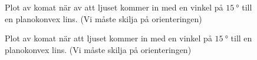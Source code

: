 \documentclass[a4paper]{article}
\begin{document}
\begin{figure}[h]
	\centering
	
	\caption{Plot av komat när av att ljuset kommer in med en vinkel på $\SI{15}{\degree}$ till en planokonvex lins. (Vi måste skilja på orienteringen)}
	\label{fig:comP1}
\end{figure}
\begin{figure}[h]
	\centering
	
	\caption{Plot av komat när att ljuset kommer in med en vinkel på $\SI{15}{\degree}$ till en planokonvex lins. (Vi måste skilja på orienteringen)}
	\label{fig:comM1}
\end{figure}

\FloatBarrier

 
 {}
 
\end{document}
